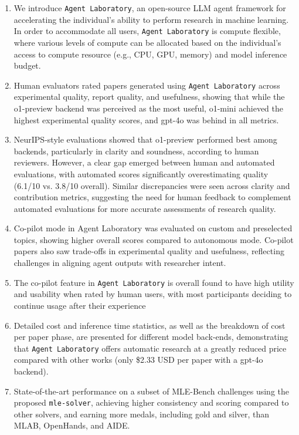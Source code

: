 \documentclass[11pt, a4paper]{gdm_format}
\begin{document}
\begin{enumerate}
    \item We introduce \texttt{Agent Laboratory}, an open-source LLM agent framework for accelerating the individual’s ability to perform research in machine learning. In order to accommodate all users, \texttt{Agent Laboratory} is compute flexible, where various levels of compute can be allocated based on the individual's access to compute resource (e.g., CPU, GPU, memory) and model inference budget.
    \item Human evaluators rated papers generated using \texttt{Agent Laboratory} across experimental quality, report quality, and usefulness, showing that while the o1-preview backend was perceived as the most useful, o1-mini achieved the highest experimental quality scores, and gpt-4o was behind in all metrics.
    \item NeurIPS-style evaluations showed that o1-preview performed best among backends, particularly in clarity and soundness, according to human reviewers. However, a clear gap emerged between human and automated evaluations, with automated scores significantly overestimating quality (6.1/10 vs. 3.8/10 overall). Similar discrepancies were seen across clarity and contribution metrics, suggesting the need for human feedback to complement automated evaluations for more accurate assessments of research quality.
    \item Co-pilot mode in Agent Laboratory was evaluated on custom and preselected topics, showing higher overall scores compared to autonomous mode. Co-pilot  papers also saw trade-offs in experimental quality and usefulness, reflecting challenges in aligning agent outputs with researcher intent.
    \item The co-pilot feature in \texttt{Agent Laboratory} is overall found to have high utility and usability when rated by human users, with most participants deciding to continue usage after their experience
    \item Detailed cost and inference time statistics, as well as the breakdown of cost per paper phase, are presented for different model back-ends, demonstrating that \texttt{Agent Laboratory} offers automatic research at a greatly reduced price compared with other works (only \$2.33 USD per paper with a gpt-4o backend).
    \item State-of-the-art performance on a subset of MLE-Bench challenges using the proposed \texttt{mle-solver}, achieving higher consistency and scoring compared to other solvers, and earning more medals, including gold and silver, than MLAB, OpenHands, and AIDE.
\end{enumerate}
\end{document}
